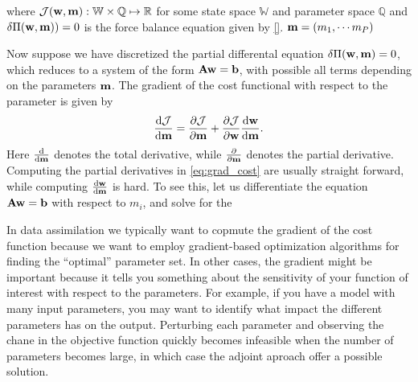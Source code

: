 where $\mathcal{J}(\mathbf{w}, \mathbf{m}): \mathbb{W} \times \mathbb{Q} \mapsto
\mathbb{R}$ for some state space $\mathbb{W}$ and parameter space
$\mathbb{Q}$ and $\delta \Pi(\mathbf{w}, \mathbf{m})) = 0$ is the force balance
equation given by \ref{}.
$\mathbf{m} = (m_1, \cdots m_P)$


Now suppose we have discretized the partial differental equation
$\delta \Pi(\mathbf{w}, \mathbf{m}) = 0$, which reduces to a system of the form
$\mathbf{A} \mathbf{w} = \mathbf{b}$, with possible all terms depending on
the parameters $\mathbf{m}$. The gradient of the cost functional with
respect to the parameter is given by
\begin{align}
  \frac{\mathrm{d} \mathcal{J}}{\mathrm{d} \mathbf{m}} = \frac{\partial \mathcal{J}}{\partial \mathbf{m}}
  + \frac{\partial \mathcal{J}}{\partial \mathbf{w}} \frac{\mathrm{d} \mathbf{w}}{\mathrm{d} \mathbf{m}}.
  \label{eq:grad_cost}
\end{align}
Here $\frac{\mathrm{d}}{\mathrm{d} \mathbf{m}}$ denotes the total
derivative, while $ \frac{\partial}{\partial \mathbf{m}}$ denotes the
partial derivative. Computing the partial derivatives in
\eqref{eq:grad_cost} are usually straight forward, while computing  $
\frac{\mathrm{d} \mathbf{w}}{\mathrm{d} \mathbf{m}}$ is hard. To see this, let
us differentiate the equation $\mathbf{A} \mathbf{w} = \mathbf{b}$ with
respect to $m_i$, and solve for the 


\begin{remark}
  In data assimilation we typically want to copmute the gradient of
  the cost function because we want to employ gradient-based
  optimization algorithms for finding the ``optimal'' parameter
  set. In other cases, the gradient might be important because it
  tells you something about the sensitivity of your function of
  interest with respect to the parameters. For example, if you have a
  model with many input parameters, you may want to identify what
  impact the different parameters has on the output. Perturbing each
  parameter and observing the chane in the objective function quickly
  becomes infeasible when the number of parameters becomes large, in
  which case the adjoint aproach offer a possible solution. 
\end{remark}



